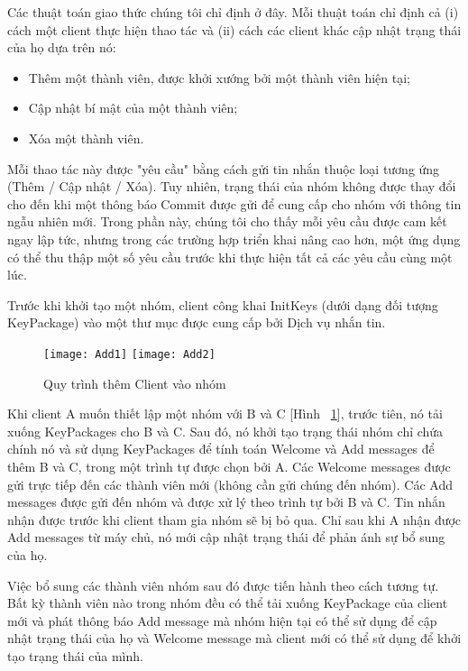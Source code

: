 \documentclass[../main-report.tex]{subfiles}
\begin{document}
Các thuật toán giao thức chúng tôi chỉ định ở đây. Mỗi thuật toán chỉ định cả (i) cách một client thực hiện thao tác và (ii) cách các client khác cập nhật trạng thái của họ dựa trên nó:

\begin{itemize}
\item{Thêm một thành viên, được khởi xướng bởi một thành viên hiện tại;}
\item{Cập nhật bí mật của một thành viên;}
\item{Xóa một thành viên.}
\end{itemize}

Mỗi thao tác này được "yêu cầu" bằng cách gửi tin nhắn thuộc loại tương ứng (Thêm / Cập nhật / Xóa). Tuy nhiên, trạng thái của nhóm không được thay đổi cho đến khi một thông báo Commit được gửi để cung cấp cho nhóm với thông tin ngẫu nhiên mới. Trong phần này, chúng tôi cho thấy mỗi yêu cầu được cam kết ngay lập tức, nhưng trong các trường hợp triển khai nâng cao hơn, một ứng dụng có thể thu thập một số yêu cầu trước khi thực hiện tất cả các yêu cầu cùng một lúc.

Trước khi khởi tạo một nhóm, client công khai InitKeys (dưới dạng đối tượng KeyPackage) vào một thư mục được cung cấp bởi Dịch vụ nhắn tin.

\begin{figure}[!h]
\begin{center}
\label{fig:Add}
\texttt{[image: Add1]}
\texttt{[image: Add2]}
\caption{Quy trình thêm Client vào nhóm}
\end{center}
\end{figure}

Khi client A muốn thiết lập một nhóm với B và C [Hình ~\ref{fig:Add}], trước tiên, nó tải xuống KeyPackages cho B và C. Sau đó, nó khởi tạo trạng thái nhóm chỉ chứa chính nó và sử dụng KeyPackages để tính toán Welcome và Add messages để thêm B và C, trong một trình tự được chọn bởi A. Các Welcome messages được gửi trực tiếp đến các thành viên mới (không cần gửi chúng đến nhóm). Các Add messages được gửi đến nhóm và được xử lý theo trình tự bởi B và C. Tin nhắn nhận được trước khi client tham gia nhóm sẽ bị bỏ qua. Chỉ sau khi A nhận được Add messages từ máy chủ, nó mới cập nhật trạng thái để phản ánh sự bổ sung của họ.

Việc bổ sung các thành viên nhóm sau đó được tiến hành theo cách tương tự. Bất kỳ thành viên nào trong nhóm đều có thể tải xuống KeyPackage của client mới và phát thông báo Add message mà nhóm hiện tại có thể sử dụng để cập nhật trạng thái của họ và Welcome message mà client mới có thể sử dụng để khởi tạo trạng thái của mình.
\end{document}
